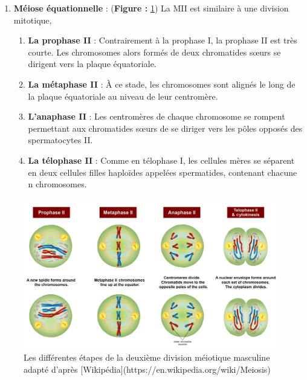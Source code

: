 \documentclass[12pt,twoside]{reedthesis}
\providecommand{\tightlist}{%
  \setlength{\itemsep}{0pt}\setlength{\parskip}{0pt}}
\theoremstyle{definition}
\theoremstyle{definition}
\theoremstyle{remark}
\begin{document}
  \begin{enumerate}
  \def\labelenumi{\arabic{enumi}.}
  \setcounter{enumi}{1}
  \tightlist
  \item
    \textbf{Méiose équationnelle} : (\textbf{Figure : }\ref{fig:meioseii})
    La MII est similaire à une division mitotique,
  
    \begin{enumerate}
    \def\labelenumii{\alph{enumii}.}
    \tightlist
    \item
      \textbf{La prophase II} : Contrairement à la prophase I, la prophase
      II est très courte. Les chromosomes alors formés de deux chromatides
      sœurs se dirigent vers la plaque équatoriale.\\
    \item
      \textbf{La métaphase II} : À ce stade, les chromosomes sont alignés
      le long de la plaque équatoriale au niveau de leur centromère.\\
    \item
      \textbf{L'anaphase II} : Les centromères de chaque chromosome se
      rompent permettant aux chromatides sœurs de se diriger vers les
      pôles opposés des spermatocytes II.\\
    \item
      \textbf{La télophase II} : Comme en télophase I, les cellules mères
      se séparent en deux cellules filles haploïdes appelées spermatides,
      contenant chacune n chromosomes.
    \end{enumerate}
  \end{enumerate}
  
  \begin{figure}
  
  {\centering \includegraphics[scale=0.43]{figure/MeiosisII} 
  
  }
  
  \caption[Les différentes étapes de la deuxième division méiotique masculine adapté]{Les différentes étapes de la deuxième division méiotique masculine adapté d'après [Wikipédia](https://en.wikipedia.org/wiki/Meiosis)}\label{fig:meioseii}
  \end{figure}
  
\end{document}
